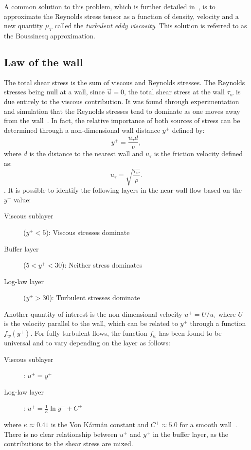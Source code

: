 A common solution to this problem, which is further detailed in~, is to approximate the Reynolds stress tensor as a function of density, velocity and a new quantity $\mu_T$ called the \emph{turbulent eddy viscosity}. This solution is referred to as the Boussinesq approximation.
%
\subsection{Law of the wall}
\label{sec:lawofthewall}
%
The total shear stress is the sum of viscous and Reynolds stresses. The Reynolds stresses being null at a wall, since $\vec{u} = 0$, the total shear stress at the wall $\tau_w$ is due entirely to the viscous contribution. It was found through experimentation and simulation that the Reynolds stresses tend to dominate as one moves away from the wall~\cite{pope2001turbulent}. In fact, the relative importance of both sources of stress can be determined through a non-dimensional wall distance $y^+$ defined by:
\begin{equation*}
    y^+ = \frac{u_\tau d}{\nu},
\end{equation*}
where $d$ is the distance to the nearest wall and $u_\tau$ is the friction velocity defined as:
\begin{equation*}
    u_\tau = \sqrt{\frac{\tau_w}\rho}.
\end{equation*}.
It is possible to identify the following layers in the near-wall flow based on the $y^+$ value:
\begin{description}
    \item[Viscous sublayer] ($y^+ < 5$): Viscous stresses dominate
    \item[Buffer layer] ($5 < y^+ < 30$): Neither stress dominates
    \item[Log-law layer] ($y^+ > 30$): Turbulent stresses dominate
\end{description}
Another quantity of interest is the non-dimensional velocity $u^+ = U/u_\tau$ where $U$ is the velocity parallel to the wall, which can be related to $y^+$ through a function $f_w(y^+)$. For fully turbulent flows, the function $f_w$ has been found to be universal and to vary depending on the layer as follows:
\begin{description}
    \item[Viscous sublayer]: $u^+ = y^+$
    \item[Log-law layer]: $u^+ = \frac{1}{\kappa} \ln y^+ + C^+$
\end{description}
where $\kappa \approx 0.41 $ is the Von Kármán constant and $C^+\approx5.0$ for a smooth wall~\cite{pope2001turbulent}. There is no clear relationship between $u^+$ and $y^+$ in the buffer layer, as the contributions to the shear stress are mixed.

